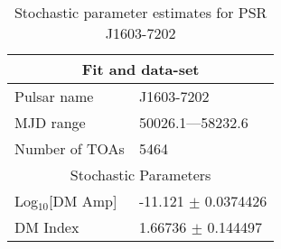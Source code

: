 \documentclass{article}
\begin{document}
\begin{table*}
\caption{Stochastic parameter estimates for PSR J1603-7202}
\begin{tabular}{ll}
\hline\hline
\multicolumn{2}{c}{Fit and data-set} \\ 
\hline
Pulsar name\dotfill & J1603-7202 \\ 
MJD range\dotfill & 50026.1---58232.6 \\ 
Number of TOAs\dotfill & 5464 \\
\hline
\multicolumn{2}{c}{Stochastic Parameters} \\ 
\hline
Log$_{10}$[DM Amp] \dotfill & -11.121 $\pm$ 0.0374426  \\ 
DM Index \dotfill & 1.66736 $\pm$ 0.144497  \\ 
\hline
\end{tabular}
\label{Table:J1603-7202}
\end{table*} 
\end{document}
